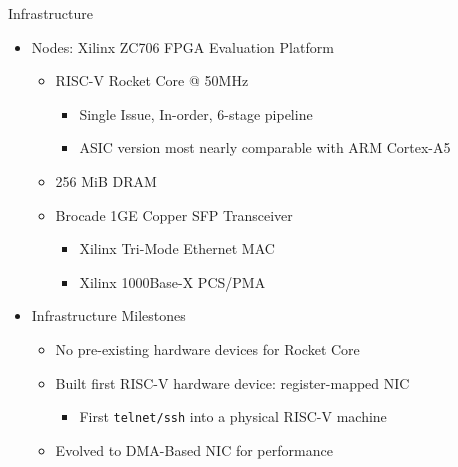 \begin{block}{Infrastructure}
    \begin{itemize}
        \item Nodes: Xilinx ZC706 FPGA Evaluation Platform
            \begin{itemize}
                \item RISC-V Rocket Core @ 50MHz
                    \begin{itemize}
                        \item Single Issue, In-order, 6-stage pipeline
                        \item ASIC version most nearly comparable with ARM Cortex-A5
                    \end{itemize}
                \item 256 MiB DRAM
                \item Brocade 1GE Copper SFP Transceiver
                    \begin{itemize}
                        \item Xilinx Tri-Mode Ethernet MAC
                        \item Xilinx 1000Base-X PCS/PMA
                    \end{itemize}

            \end{itemize} 
        \item Infrastructure Milestones
            \begin{itemize}
                \item No pre-existing hardware devices for Rocket Core
                \item Built first RISC-V hardware device: register-mapped NIC
                    \begin{itemize}
                        \item First \texttt{telnet/ssh} into a physical RISC-V machine
                    \end{itemize}
                \item Evolved to DMA-Based NIC for performance
            \end{itemize}
    \end{itemize}


\end{block}
